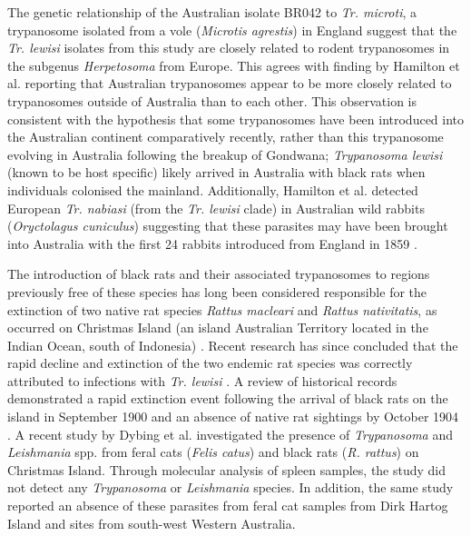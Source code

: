 \documentclass[a4paper, nobind]{templates/ociamthesis}
\begin{document}
The genetic relationship of the Australian isolate BR042 to \emph{Tr. microti}, a trypanosome isolated from a vole (\emph{Microtis agrestis}) in England suggest that the \emph{Tr. lewisi} isolates from this study are closely related to rodent trypanosomes in the subgenus \emph{Herpetosoma} from Europe. This agrees with finding by Hamilton et al. \autocite*{hamiltonEvolutionTrypanosomaCruzi2012} reporting that Australian trypanosomes appear to be more closely related to trypanosomes outside of Australia than to each other. This observation is consistent with the hypothesis that some trypanosomes have been introduced into the Australian continent comparatively recently, rather than this trypanosome evolving in Australia following the breakup of Gondwana; \emph{Trypanosoma lewisi} (known to be host specific) likely arrived in Australia with black rats when individuals colonised the mainland. Additionally, Hamilton et al. \autocite*{hamiltonInadvertentIntroductionAustralia2005} detected European \emph{Tr. nabiasi} (from the \emph{Tr. lewisi} clade) in Australian wild rabbits (\emph{Oryctolagus cuniculus}) suggesting that these parasites may have been brought into Australia with the first 24 rabbits introduced from England in 1859 \autocite{hamiltonInadvertentIntroductionAustralia2005}.

The introduction of black rats and their associated trypanosomes to regions previously free of these species has long been considered responsible for the extinction of two native rat species \emph{Rattus macleari} and \emph{Rattus nativitatis}, as occurred on Christmas Island (an island Australian Territory located in the Indian Ocean, south of Indonesia) \autocite{wyattHistoricalMammalExtinction2008}. Recent research has since concluded that the rapid decline and extinction of the two endemic rat species was correctly attributed to infections with \emph{Tr. lewisi} \autocite{wyattHistoricalMammalExtinction2008}. A review of historical records demonstrated a rapid extinction event following the arrival of black rats on the island in September 1900 and an absence of native rat sightings by October 1904 \autocite{greenMammalExtinctionIntroduced2014}. A recent study by Dybing et al. \autocite*{dybingGhostsChristmasAbsence2016} investigated the presence of \emph{Trypanosoma} and \emph{Leishmania} spp. from feral cats (\emph{Felis catus}) and black rats (\emph{R. rattus}) on Christmas Island. Through molecular analysis of spleen samples, the study did not detect any \emph{Trypanosoma} or \emph{Leishmania} species. In addition, the same study reported an absence of these parasites from feral cat samples from Dirk Hartog Island and sites from south-west Western Australia.
\end{document}
